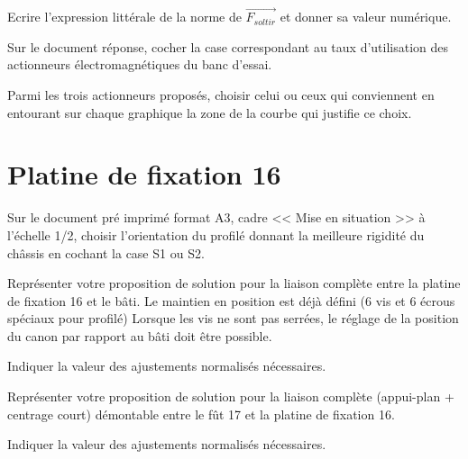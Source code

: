 \documentclass[11pt]{article}
\begin{document}
\UPSTIquestion Ecrire l'expression littérale de la norme de $\overrightarrow{F_{sol tir}}$ et donner sa valeur numérique.
\begin{UPSTIcorrige}
\end{UPSTIcorrige}

\UPSTIquestion Sur le document réponse, cocher la case correspondant au taux d'utilisation des actionneurs électromagnétiques du banc d'essai.
\begin{UPSTIcorrige}
\end{UPSTIcorrige}

\UPSTIquestion Parmi les trois actionneurs proposés, choisir celui ou ceux qui conviennent en entourant sur chaque graphique la zone de la courbe qui justifie ce choix.
\begin{UPSTIcorrige}
\end{UPSTIcorrige}



\section{Platine de fixation 16}

\UPSTIquestion* Sur le document pré imprimé format A3, cadre << Mise en situation >> à l'échelle 1/2, choisir l'orientation du profilé donnant la meilleure rigidité du châssis en cochant la case S1 ou S2. 
\begin{UPSTIcorrige}
\end{UPSTIcorrige}

\UPSTIquestion Représenter votre proposition de solution pour la liaison complète entre la platine de fixation 16 et le bâti. Le maintien en position est déjà défini (6 vis et 6 écrous spéciaux pour profilé) Lorsque les vis ne sont pas serrées, le réglage de la position du canon par rapport au bâti doit être possible.

Indiquer la valeur des ajustements normalisés nécessaires.
\begin{UPSTIcorrige}
\end{UPSTIcorrige}

\UPSTIquestion Représenter votre proposition de solution pour la liaison complète (appui-plan + centrage court) démontable entre le fût 17 et la platine de fixation 16. 

Indiquer la valeur des ajustements normalisés nécessaires.
\begin{UPSTIcorrige}
\end{UPSTIcorrige}
\end{document}
